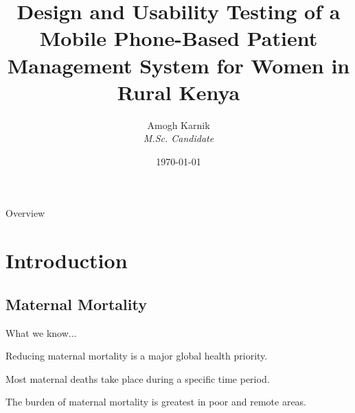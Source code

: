 \documentclass[xcolor=x11names, handout, compress]{beamer}
\renewcommand{\(}{\begin{columns}}
\renewcommand{\)}{\end{columns}}
\newcommand{\<}[1]{\begin{column}{#1}}
\renewcommand{\>}{\end{column}}
\begin{document}
\title{Design and Usability Testing of a Mobile Phone-Based Patient Management System for Women in Rural Kenya}
\author[Amogh Karnik]{
	Amogh Karnik\\
	{\it M.Sc. Candidate}\\
}
\date{\today}

\begin{frame}
\titlepage
\end{frame}

\begin{frame}{Overview}
\tableofcontents
\end{frame}


\section{Introduction}
\subsection{Maternal Mortality}

\begin{frame}{What we know...}

\begin{block}{
Reducing maternal mortality is a major global health priority. }
\end{block}
\begin{block}{
Most maternal deaths take place during a specific time period.}
\end{block}
\begin{block}{
The burden of maternal mortality is greatest in poor and remote areas.}
\end{block}
\end{frame}
\end{document}
